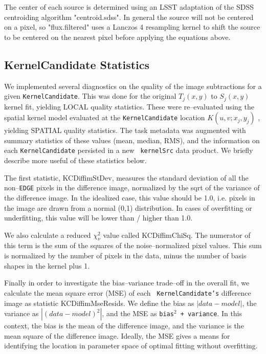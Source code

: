 \documentclass[prd, nofootinbib, floatfix, 11pt,tightenlines,times]{article}
\begin{document}
The center of each source is determined using an LSST adaptation of
the SDSS centroiding algorithm "centroid.sdss". In general the source
will not be centered on a pixel, so "flux.filtered" uses a Lanczos 4
resampling kernel to shift the source to be centered on the nearest
pixel before applying the equations above.

\subsection{KernelCandidate Statistics \label{sec-stats}}

We implemented several diagnostics on the quality of the image
subtractions for a given {\tt KernelCandidate}.  This was done for the
original $T_j(x,y)$ to $S_j(x,y)$ kernel fit, yielding LOCAL quality
statistics.  These were re--evaluated using the spatial kernel model
evaluated at the {\tt KernelCandidate} location $K(u,v;x_j,y_j)$ ,
yielding SPATIAL quality statistics.  The task metadata was augmented
with summary statistics of these values (mean, median, RMS), and the
information on each {\tt KernelCandidate} persisted in a new {\tt
  kernelSrc} data product.  We briefly describe more useful of these
statistics below.

The first statistic, KCDiffimStDev, measures the standard deviation of
all the non--{\tt EDGE} pixels in the difference image, normalized by
the sqrt of the variance of the difference image.  In the idealized
case, this value should be 1.0, i.e. pixels in the image are drawn
from a normal (0,1) distribution.  In cases of overfitting or
underfitting, this value will be lower than / higher than 1.0.

We also calculate a reduced $\chi^2_\nu$ value called KCDiffimChiSq.
The numerator of this term is the sum of the squares of the
noise--normalized pixel values.  This sum is normalized by the number
of pixels in the data, minus the number of basis shapes in the kernel
plus 1.

Finally in order to investigate the bias--variance trade--off in the
overall fit, we calculate the mean square error (MSE) of each {\tt
  KernelCandidate's} difference image as statistic KCDiffimMseResids.
We define the bias as $\left| data - model \right|$, the variance as
$\left| (data - model)^2 \right|$, and the MSE as {\tt bias$^2$ +
  variance}.  In this context, the bias is the mean of the difference
image, and the variance is the mean square of the difference image.
Ideally, the MSE gives a means for identifying the location in
parameter space of optimal fitting without overfitting.
\end{document}
